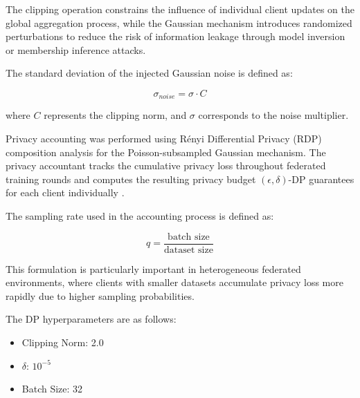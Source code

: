 \documentclass[conference]{IEEEtran}
\begin{document}
The clipping operation constrains the influence of individual client updates on the global aggregation process, while the Gaussian mechanism introduces randomized perturbations to reduce the risk of information leakage through model inversion or membership inference attacks.

The standard deviation of the injected Gaussian noise is defined as:

$$\sigma_{noise} = \sigma \cdot C$$

where $C$ represents the clipping norm, and $\sigma$ corresponds to the noise multiplier.

Privacy accounting was performed using Rényi Differential Privacy (RDP) composition analysis for the Poisson-subsampled Gaussian mechanism. The privacy accountant tracks the cumulative privacy loss throughout federated training rounds and computes the resulting privacy budget $(\epsilon,\delta)$-DP guarantees for each client individually \cite{mironov2017}.

The sampling rate used in the accounting process is defined as:

$$q=\frac{\text{batch size}}{\text{dataset size}}$$

This formulation is particularly important in heterogeneous federated environments, where clients with smaller datasets accumulate privacy loss more rapidly due to higher sampling probabilities.

The DP hyperparameters are as follows:

\begin{itemize}
    \item Clipping Norm: 2.0
    \item $\delta$: $10^{-5}$
    \item Batch Size: 32
\end{itemize}
\end{document}
